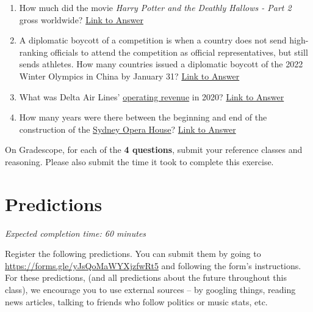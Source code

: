 \documentclass[11pt]{article}
\begin{document}
\begin{enumerate}
	\item How much did the movie \emph{Harry Potter and the Deathly Hallows - Part 2} gross worldwide? \href{https://en.wikipedia.org/wiki/Harry_Potter_and_the_Deathly_Hallows_%E2%80%93_Part_2#Box_office}{Link to Answer}
	\item A diplomatic boycott of a competition is when a country does not send high-ranking officials to attend the competition as official representatives, but still sends athletes. How many countries issued a diplomatic boycott of the 2022 Winter Olympics in China by January 31? \href{https://en.wikipedia.org/wiki/2022_Winter_Olympics#Diplomatic_boycotts}{Link to Answer}
	\item What was Delta Air Lines' \href{https://www.investopedia.com/terms/o/operating-revenue.asp}{operating revenue} in 2020? \href{https://ir.delta.com/news/news-details/2021/Delta-Air-Lines-Announces-December-Quarter-and-Full-Year-2020-Financial-Results/default.aspx}{Link to Answer}
	\item How many years were there between the beginning and end of the construction of the \href{https://en.wikipedia.org/wiki/Sydney_Opera_House#/media/File:Sydney_Australia._(21339175489).jpg}{Sydney Opera House}? \href{https://en.wikipedia.org/wiki/Sydney_Opera_House}{Link to Answer}
	
\end{enumerate}

On Gradescope, for each of the \textbf{4 questions}, submit your reference classes and reasoning. Please also submit the time it took to complete this exercise.

\section*{Predictions}

\emph{Expected completion time: 60 minutes}

Register the following predictions. You can submit them by going to \url{https://forms.gle/yJsQoMaWYXjzfwRt5} and following the form's instructions. For these predictions, (and all predictions about the future throughout this class), we encourage you to use external sources -- by googling things, reading news articles, talking to friends who follow politics or music stats, etc.
\end{document}
